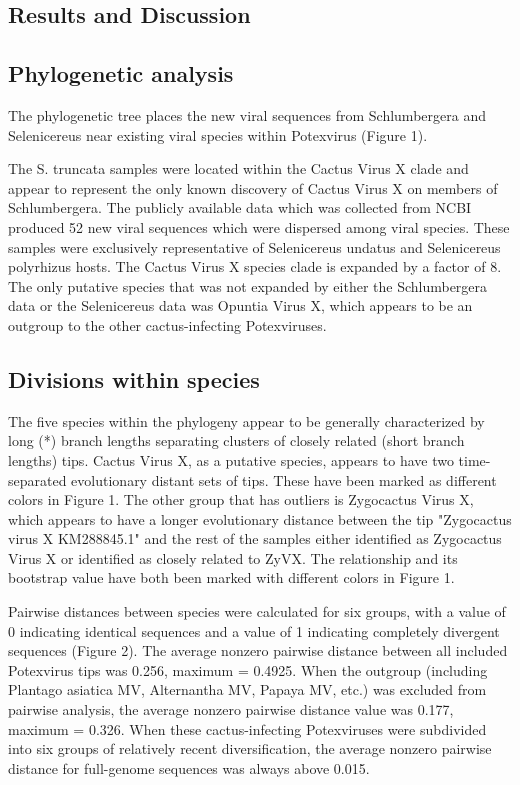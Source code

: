 \documentclass[11pt,letterpaper,titlepage]{article}
\begin{document}
\begin{linenumbers}
\section*{Results and Discussion}

\subsection*{Phylogenetic analysis}
The phylogenetic tree places the new viral sequences from Schlumbergera and Selenicereus near existing viral species within Potexvirus (Figure 1). 

The S. truncata samples were located within the Cactus Virus X clade and appear to represent the only known discovery of Cactus Virus X on members of Schlumbergera. 
The publicly available data which was collected from NCBI produced 52 new viral sequences which were dispersed among viral species. 
These samples were exclusively representative of Selenicereus undatus and Selenicereus polyrhizus hosts. 
The Cactus Virus X species clade is expanded by a factor of 8. 
The only putative species that was not expanded by either the Schlumbergera data or the Selenicereus data was Opuntia Virus X, which appears to be an outgroup to the other cactus-infecting Potexviruses. 

\subsection*{Divisions within species}
The five species within the phylogeny appear to be generally characterized by long (*) branch lengths separating clusters of closely related (short branch lengths) tips. 
Cactus Virus X, as a putative species, appears to have two time-separated evolutionary distant sets of tips. 
These have been marked as different colors in Figure 1. 
The other group that has outliers is Zygocactus Virus X, which appears to have a longer evolutionary distance between the tip "Zygocactus virus X KM288845.1" and the rest of the samples either identified as Zygocactus Virus X or identified as closely related to ZyVX. 
The relationship and its bootstrap value have both been marked with different colors in Figure 1. 

Pairwise distances between species were calculated for six groups, with a value of 0 indicating identical sequences and a value of 1 indicating completely divergent sequences (Figure 2). 
The average nonzero pairwise distance between all included Potexvirus tips was 0.256, maximum = 0.4925. 
When the outgroup (including Plantago asiatica MV, Alternantha MV, Papaya MV, etc.) was excluded from pairwise analysis, the average nonzero pairwise distance value was 0.177, maximum = 0.326. 
When these cactus-infecting Potexviruses were subdivided into six groups of relatively recent diversification, the average nonzero pairwise distance for full-genome sequences was always above 0.015. 


\end{linenumbers}
\end{document}
